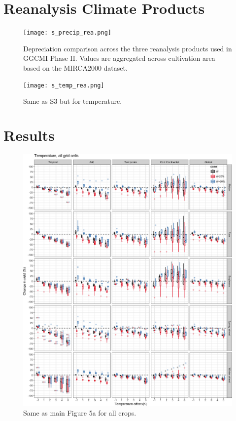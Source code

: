 \documentclass[10pt]{article}
\begin{document}
\clearpage
\section{Reanalysis Climate Products}
\begin{figure}[h!]
\centering
\texttt{[image: s\_precip\_rea.png]}
\caption{Depreciation comparison across the three reanalysis products used in GGCMI Phase II. Values are aggregated across cultivation area based on the MIRCA2000 dataset.}
\label{fig:precip_rea}
\end{figure}

\begin{figure}[h!]
\centering
\texttt{[image: s\_temp\_rea.png]}
\caption{Same as S3 but for temperature.}
\label{fig:precip_rea}
\end{figure}

\clearpage
\section{Results}
\begin{figure}[h!]
\centering
\includegraphics[width=\textwidth]{s_sim_CG_T.png}
\caption{Same as main Figure 5a for all crops.}
\label{fig:temperautre}
\end{figure}
\end{document}
